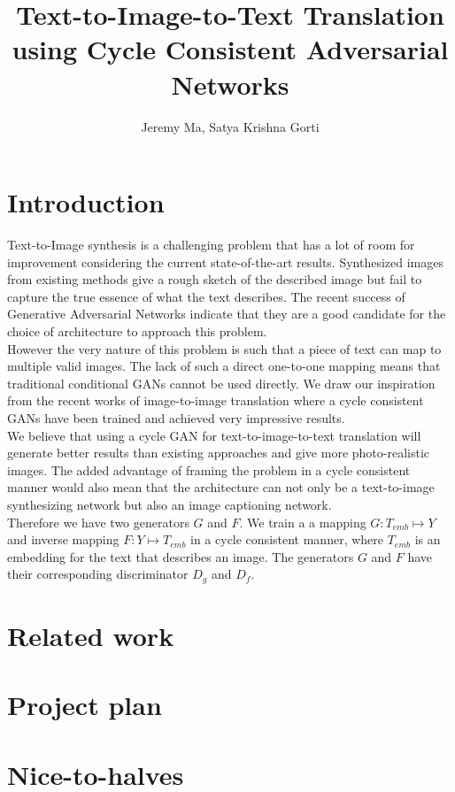 \documentclass[]{article}
\title{Text-to-Image-to-Text Translation using Cycle Consistent Adversarial Networks}
\author{Jeremy Ma, Satya Krishna Gorti}
\date{}
\begin{document}
\maketitle

\begin{abstract}

\end{abstract}

\section{Introduction}

Text-to-Image synthesis is a challenging problem that has a lot of room for improvement considering the current state-of-the-art results. Synthesized images from existing methods give a rough sketch of the described image but fail to capture the true essence of what the text describes. The recent success of Generative Adversarial Networks \cite{goodfellow2014generative} indicate that they are a good candidate for the choice of architecture to approach this problem.
\\

However the very nature of this problem is such that a piece of text can map to multiple valid images. The lack of such a direct one-to-one mapping means that traditional conditional GANs \cite{mirza2014conditional} cannot be used directly. We draw our inspiration from the recent works of image-to-image translation \cite{liu2017unsupervised}\cite{zhu2017unpaired} where a cycle consistent GANs have been trained and achieved very impressive results.
\\

We believe that using a cycle GAN for text-to-image-to-text translation will generate better results than existing approaches and give more photo-realistic images. The added advantage of framing the problem in a cycle consistent manner would also mean that the architecture can not only be a text-to-image synthesizing network but also an image captioning network.
\\

Therefore we have two generators $G$ and $F$. We train a a mapping $G: T_{emb} \mapsto Y$ and inverse mapping $F: Y \mapsto T_{emb}$ in a cycle consistent manner, where $T_{emb}$ is an embedding for the text that describes an image. The generators $G$ and $F$ have their corresponding discriminator $D_g$ and $D_f$.

\section{Related work}


\section{Project plan}

\section{Nice-to-halves}



\end{document}
